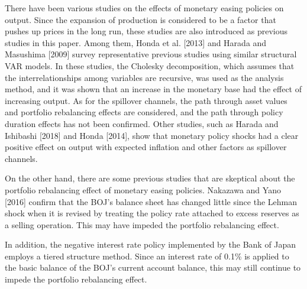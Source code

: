 \documentclass[12pt]{article}
\begin{document}
There have been various studies on the effects of monetary easing policies on output.
Since the expansion of production is considered to be a factor that pushes up prices in the long run, these studies are also introduced as previous studies in this paper.
Among them, Honda et al. [2013] and Harada and Masushima [2009] survey representative previous studies using similar structural VAR models.
In these studies, the Cholesky decomposition, which assumes that the interrelationships among variables are recursive, was used as the analysis method, and it was shown that an increase in the monetary base had the effect of increasing output.
As for the spillover channels, the path through asset values and portfolio rebalancing effects are considered, and the path through policy duration effects has not been confirmed.
Other studies, such as Harada and Ishibashi [2018] and Honda [2014], show that monetary policy shocks had a clear positive effect on output with expected inflation and other factors as spillover channels.

On the other hand, there are some previous studies that are skeptical about the portfolio rebalancing effect of monetary easing policies.
Nakazawa and Yano [2016] confirm that the BOJ's balance sheet has changed little since the Lehman shock when it is revised by treating the policy rate attached to excess reserves as a selling operation.
This may have impeded the portfolio rebalancing effect.

In addition, the negative interest rate policy implemented by the Bank of Japan employs a tiered structure method.
Since an interest rate of 0.1\% is applied to the basic balance of the BOJ's current account balance, this may still continue to impede the portfolio rebalancing effect.
\end{document}
